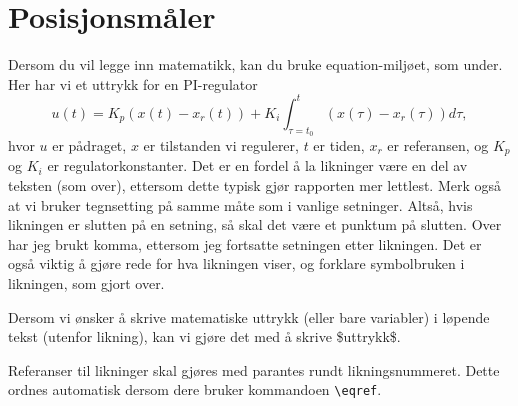\section{Posisjonsmåler}\label{sec:pos_måler}
Dersom du vil legge inn matematikk, kan du bruke equation-miljøet, som under. Her har vi et uttrykk for en
PI-regulator
\begin{equation}
    u(t) = K_p (x(t)-x_r(t)) + K_i\int_{\tau=t_0}^t (x(\tau)-x_r(\tau))d\tau,
    \label{eq:PI_regulator}
\end{equation}
hvor $u$ er pådraget, $x$ er tilstanden vi regulerer, $t$ er tiden, $x_r$ er referansen, og $K_p$ og $K_i$ er regulatorkonstanter. Det er en fordel å la likninger være en del av teksten (som over), ettersom dette typisk gjør rapporten mer lettlest. Merk også at vi bruker tegnsetting på samme måte som i vanlige setninger. Altså,
hvis likningen er slutten på en setning, så skal det være et punktum på slutten. Over har jeg brukt komma, ettersom jeg fortsatte setningen etter likningen. Det er også viktig å gjøre rede for hva likningen viser,
og forklare symbolbruken i likningen, som gjort over.

Dersom vi ønsker å skrive matematiske uttrykk (eller bare variabler) i løpende tekst (utenfor likning),
kan vi gjøre det med å skrive \$uttrykk\$.

Referanser til likninger skal gjøres med parantes rundt likningsnummeret. Dette ordnes automatisk dersom dere
bruker kommandoen \texttt{\textbackslash eqref}.
